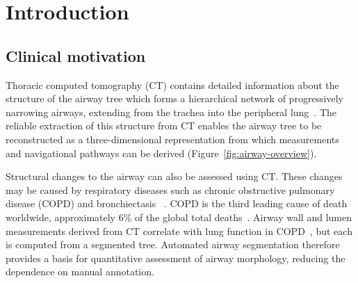 \chapter{Introduction}
\label{ch:introduction}

%
%

\section{Clinical motivation}

Thoracic computed tomography (CT) contains detailed information about the structure of the airway tree 
which forms a hierarchical network of progressively narrowing airways, extending from the
trachea into the peripheral lung~\cite{Weibel1962Architecture}. The reliable extraction of this structure from CT enables the airway
tree to be reconstructed as a three-dimensional representation from which measurements and
navigational pathways can be derived (Figure~\ref{fig:airway-overview}).

Structural changes to the airway can also be assessed using CT. These changes may be caused by respiratory diseases such as
chronic obstructive pulmonary disease (COPD) and bronchiectasis
~\cite{Wang2023qct,Aliberti2022bronchiectasis}.
COPD is the third leading cause of death worldwide, approximately 6\% of the global total deaths~\cite{who2026copd}. 
Airway wall and lumen measurements derived from CT correlate with lung function in COPD~\cite{Wang2023qct}, 
but each is computed from a segmented tree. Automated airway segmentation therefore provides a basis for 
quantitative assessment of airway morphology, reducing the dependence on manual annotation.

